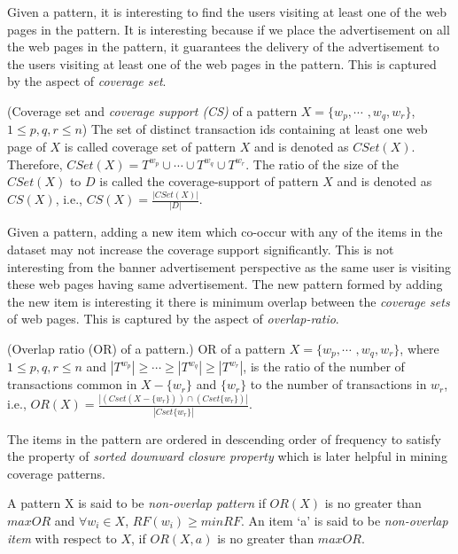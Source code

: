 	Given a pattern, it is interesting to find the users visiting at least one of the web pages in the pattern. It is interesting because if we place the advertisement on all the web pages in the pattern, it guarantees the delivery of the advertisement to the users visiting at least one of the web pages in the pattern. This is captured by the aspect of \emph{coverage set}.

\begin{mydef} \label{csup}
(Coverage set and \emph{coverage support (CS)} of a pattern $X = \{w_p, \cdots$ $,w_q, w_r\}$, $1\leq p, q, r \leq n$) The set of distinct transaction ids containing at least one web page of $X$ is called coverage set of pattern $X$ and is denoted as $CSet(X)$. Therefore, $CSet(X) = T^{w_p}\cup \cdots  \cup T^{w_q} \cup T^{w_r}$. The ratio of the size of the $CSet(X)$ to $D$ is called the coverage-support of pattern $X$ and is denoted as $CS(X)$, i.e., $CS(X) = \frac{|CSet(X)|}{|D|}$.
\end{mydef}
	
	Given a pattern, adding a new item which co-occur with any of the items in the dataset may not increase the coverage support significantly. This is not interesting from the banner advertisement perspective as the same user is visiting these web pages having same advertisement. The new pattern formed by adding the new item is interesting it there is minimum overlap between the \emph{coverage sets} of web pages. This is captured by the aspect of \emph{overlap-ratio}.
	 
\begin{mydef}
(Overlap ratio (OR) of a pattern.) OR of a pattern $X=\{w_p,\cdots$ $,w_q,w_r\}$, where $1\leq p, q, r \leq n$ and $|T^{w_p}|\geq\cdots \geq |T^{w_{q}}| \geq |T^{w_{r}}| $, is the ratio of the number of transactions common in $X-\{w_r\}$ and $\{w_r\}$ to the number of transactions in $w_r$, i.e., $OR(X) = \frac{|(Cset(X-\{w_r\})) \cap (Cset\{w_r\})|} {|Cset\{w_r\}|}$.
\label{overLap}
\end{mydef}
	The items in the pattern are ordered in descending order of frequency to satisfy the property of \emph{sorted downward closure property} which is later helpful in mining coverage patterns.
	   
	 A pattern X is said to be \emph{non-overlap pattern} if $OR(X)$ is no greater than $maxOR$ and $ \forall w_i \in X$, $RF(w_i) \geq minRF$. An item `a' is said to be \emph{non-overlap item} with respect to $X$, if $OR({X,a})$ is no greater than $maxOR$.
	
